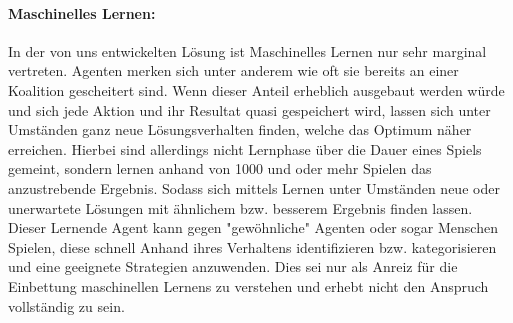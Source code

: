\documentclass[fleqn,10pt]{SelfArx} %
\begin{document}
\paragraph{Maschinelles Lernen:} 
In der von uns entwickelten Lösung ist Maschinelles Lernen nur sehr marginal vertreten. Agenten merken sich unter anderem wie oft sie bereits an einer Koalition gescheitert sind. Wenn dieser Anteil erheblich ausgebaut werden würde und sich jede Aktion und ihr Resultat quasi gespeichert wird, lassen sich unter Umständen ganz neue Lösungsverhalten finden, welche das Optimum näher erreichen. Hierbei sind allerdings nicht Lernphase über die Dauer eines Spiels gemeint, sondern lernen anhand von 1000 und oder mehr Spielen das anzustrebende Ergebnis. Sodass sich mittels Lernen unter Umständen neue oder unerwartete Lösungen mit ähnlichem bzw. besserem Ergebnis finden lassen. Dieser Lernende Agent kann gegen "gewöhnliche" Agenten oder sogar Menschen Spielen, diese schnell Anhand ihres Verhaltens identifizieren bzw. kategorisieren und eine geeignete Strategien anzuwenden. Dies sei nur als Anreiz für die Einbettung maschinellen Lernens zu verstehen und erhebt nicht den Anspruch vollständig zu sein.
\end{document}
